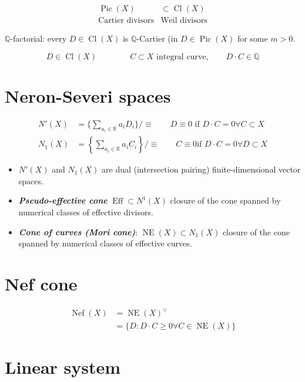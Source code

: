 \begin{align*}
\operatorname{Pic}(X)	&\subset \operatorname{Cl}(X)\\
\text{Cartier divisors} &\text{Weil divisors} 
\end{align*}

\begin{defn}
	$\mathbb{Q}$-factorial: every $D\in\operatorname{Cl}(X)$ is $\mathbb{Q}$-Cartier (in $D\in\operatorname{Pic}(X)$ for some $m>0$.

	 \[D\in\operatorname{Cl}(X)\qquad \qquad C\subset X\text{ integral curve}, \qquad D\cdot C\in\mathbb{Q} \]

\end{defn}
\section{Neron-Severi spaces}

\begin{align*}
	N'(X)&=\{\sum_{a_i\in\mathbb{R}}a_iD_i\} /\equiv\qquad D\equiv 0 \text{ if } D\cdot C=0\forall C\subset X\\
	N_1(X)&=\left\{ \sum_{a_i\in\mathbb{R}}a_iC_i \right\}/\equiv\qquad C\equiv 0\text{if }D\cdot C=0\forall D\subset X 
\end{align*}

\begin{itemize}
\item $N'(X)$ and  $N_1(X)$ are dual (intersection pairing) finite-dimensional vector spaces.
\item \textit{\textbf{Pseudo-effective cone}}  $\operatorname{Eff}\subset N^1(X)$ closure of the cone spanned by numerical classes of effective divisors.
\item \textit{\textbf{Cone of curves (Mori cone)}}:  $\operatorname{NE}(X)\subset N_1(X)$ closure of the cone spanned by numerical classes of effective curves.
\end{itemize}

\section{Nef cone}

\begin{align*}
	\operatorname{Nef}(X)&=\operatorname{NE}(X)^\vee\\
	&=\{D:D\cdot C\geq 0\forall C\in \operatorname{NE}(X)\}
\end{align*}

\section{Linear system}

